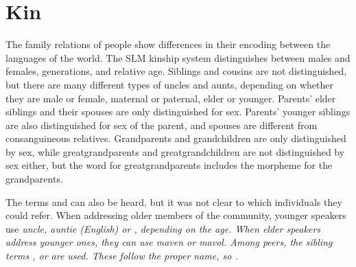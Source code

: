 




\section{Kin}\label{sec:func:Kin}
The family relations of people show differences in their encoding between the languages of the world.
The SLM kinship system distinguishes between males and females, generations, and relative age. Siblings and cousins are not distinguished, but there are many different types of uncles and aunts, depending on whether they are male or female, maternal or paternal, elder or younger. Parents' elder siblings and their spouses are only distinguished for sex. Parents' younger siblings are also distinguished for sex of the parent, and spouses are different from consanguineous relatives.  Grandparents and grandchildren are only distinguished by sex, while greatgrandparents and greatgrandchildren are not distinguished by sex either, but the word for greatgrandparents includes the morpheme for the grandparents.

The terms  and  can also be heard, but it was not clear to which individuals they could refer. When addressing older members of the community, younger speakers use \em uncle, auntie \em (English) or , depending on the age. When elder speakers address younger ones, they can use \em maven \em or \em mavol\em. Among peers, the sibling terms ,  or  are used. These follow the proper name, so .


